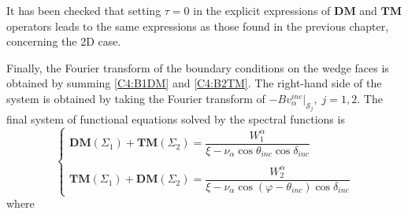 It has been checked that setting $\tau=0$ in the explicit expressions of $\mathbf{DM}$ and $\mathbf{TM}$ operators leads to the same expressions as those found in the previous chapter, concerning the 2D case.

Finally, the Fourier transform of the boundary conditions on the wedge faces is obtained by summing \eqref{C4:B1DM} and \eqref{C4:B2TM}. The right-hand side of the system is obtained by taking the Fourier transform of $-Bv_{\alpha}^{inc}|_{\mathcal{S}_j}, \; j=1,2$. The final system of functional equations solved by the spectral functions is 
\begin{equation}
\left\{
\begin{matrix}
\textbf{DM}(\Sigma_1)+\textbf{TM}(\Sigma_2)=\dfrac{W_1^{\alpha}}{\xi-\nu_{\alpha} \cos \theta_{inc}\cos\delta_{inc}} 
\\
~\\
\textbf{TM}(\Sigma_1)+\textbf{DM}(\Sigma_2)=\dfrac{W_2^{\alpha}}{\xi-\nu_{\alpha}\cos(\varphi-\theta_{inc})\cos\delta_{inc}}
\end{matrix}
\right.
\label{C4:equationsintegrales}
\end{equation}
where
